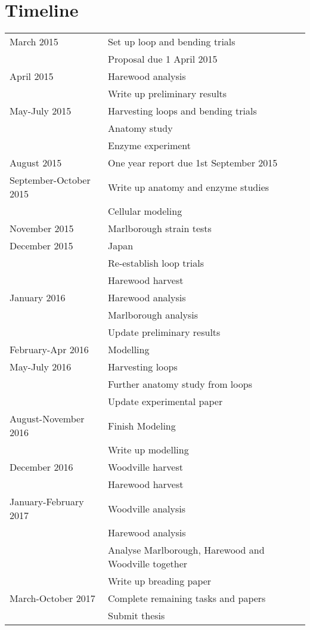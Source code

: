 \documentclass{article}
\begin{document}
\section{Timeline}
\onehalfspacing
\begin{tabular}{ l l }
\hline
  March 2015 & Set up loop and bending trials \\
   & Proposal due 1 April 2015 \\
   \hline
  April 2015 & Harewood analysis \\
  & Write up preliminary results \\
  \hline
  May-July 2015 & Harvesting loops and bending trials \\
  & Anatomy study\\
  & Enzyme experiment\\
  \hline
  August 2015 & One year report due 1st September 2015\\
  \hline
  September-October 2015&Write up anatomy and enzyme studies\\
  &Cellular modeling\\
  \hline
  November 2015&Marlborough strain tests\\
  \hline
  December 2015 & Japan \\
  &Re-establish loop trials\\
  & Harewood harvest\\
  \hline
  January 2016&Harewood analysis\\
  &Marlborough analysis\\
  & Update preliminary results \\
  \hline
  February-Apr 2016 & Modelling\\
  \hline
  May-July 2016&Harvesting loops\\
  &Further anatomy study from loops\\
  &Update experimental paper\\
  \hline
  August-November 2016&Finish Modeling\\
  &Write up modelling\\
  \hline
  December 2016&Woodville harvest\\
  &Harewood harvest\\
  \hline
  January-February 2017&Woodville analysis\\
  &Harewood analysis\\
  &Analyse Marlborough, Harewood and Woodville together\\
  &Write up breading paper\\
  \hline
  March-October 2017&Complete remaining tasks and papers\\
  &Submit thesis\\
  \hline
\end{tabular}
\doublespacing
\end{document}
